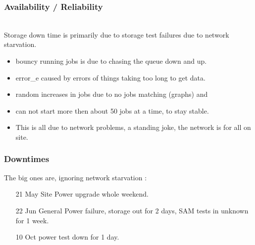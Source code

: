 \documentclass{beamer}
\begin{document}
\begin{frame}
  \frametitle{Availability / Reliability}
\vspace{0.5cm}
\\
\vspace{0.5cm}
Storage down time is primarily due to storage test failures due to network starvation.
\end{frame}

\begin{frame}
    \begin{itemize}
            \item bouncy running jobs is due to chasing the queue down and up.
    \item error\_e caused by errors of things taking too long to get data.
    \item random increases in jobs due to no jobs matching (graphs) and 
    \item can not start more then about 50 jobs at a time, to stay stable.
        \item This is all due to network problems, a standing joke, the network is for all on site.
    \end{itemize}
\end{frame}

\begin{frame}
\frametitle{Downtimes}
The big ones are, ignoring network starvation :
\begin{itemize}
  \item [21 May] Site Power upgrade whole weekend.
  \item [22 Jun] General Power failure, storage out for 2 days, SAM tests in unknown for 1 week.
  \item [10 Oct] power test down for 1 day.
\end{itemize}
\end{frame}
\end{document}
